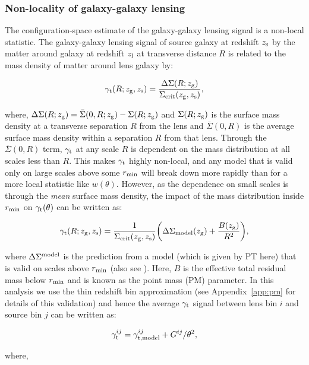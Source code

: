 \documentclass[aps, prd,twocolumn,superscriptaddress,nofootinbib,preprintnumbers]{revtex4-1}
\newcommand{\gammat}{\ensuremath{\gamma_{\rm t}(\theta)}}
\newcommand{\wtheta}{\ensuremath{w(\theta)}}
\newcommand{\SP}[1]{{\color{orange}[SP: #1]}}
\newcommand{\gary}[1]{\textcolor{red}{#1}}
\begin{document}
\subsubsection{Non-locality of galaxy-galaxy lensing}  \label{sec:pm_theory}
The configuration-space estimate of the galaxy-galaxy lensing signal is a
non-local statistic. The galaxy-galaxy lensing
signal of source galaxy at redshift $z_{\rm s}$ by the matter around
galaxy at redshift $z_{\rm l}$ at transverse
distance $R$ is related to the mass density of matter around lens
galaxy by:
\begin{linenomath*}
\begin{equation}
    \gamma_{\rm t}(R;z_{\rm g},z_{\rm s}) = \frac{\Delta \Sigma (R;z_{\rm g})}{\Sigma_{\rm crit} (z_{\rm g},z_{\rm s})},
\end{equation}
\end{linenomath*}
where, $\Delta \Sigma(R;z_{\rm g}) = \bar{\Sigma}(0,R; z_{\rm g}) - \Sigma(R;z_{\rm g})$ and $\Sigma(R;z_{\rm g})$ is the surface mass density at a transverse separation $R$ from the lens and $\bar{\Sigma}(0,R)$ is the average surface mass density within a separation $R$ from that lens. Through the $\bar{\Sigma}(0,R)$ term, $\gamma_{\rm t}$  at any scale $R$ is dependent on the mass distribution at all scales less than $R$. This makes $\gamma_{\rm t}$  highly non-local, and any model that is valid only on large scales above some $r_{\rm min}$ will break down more rapidly than for a more local statistic like \wtheta. However, as the dependence on small scales is through the \textit{mean} surface mass density, the impact of the mass distribution inside $r_{\rm min}$ on $\gammat$ can be written as:
\begin{linenomath*}
\begin{equation}
    \gamma_{\rm t}(R;z_{\rm g},z_{\rm s}) = \frac{1}{\Sigma_{\rm crit}(z_{\rm g},z_{\rm s})} \bigg(\Delta \Sigma_{\rm model}(z_{\rm g}) + \frac{B(z_{\rm g})}{R^2} \bigg),
\end{equation}
\end{linenomath*}
where $\Delta \Sigma^{\rm model}$ is the prediction from a model (which is given by PT here) that is valid on scales above $r_{\rm min}$ (also see \citep{Baldauf_2010}). Here, $B$ is the effective total residual mass below $r_{\rm min}$ and is known as the point mass (PM) parameter. In this analysis we use the thin redshift bin approximation 
(see Appendix~\ref{app:pm} for details of this validation) and hence the average $\gamma_{\rm t}$ signal between lens bin $i$ and source bin $j$ can be written as:
\begin{linenomath*}
\begin{equation}
    \gamma^{ij}_{{\rm t}} = \gamma^{ij}_{{\rm t, model}} + G^{ij}/\theta^2,
\end{equation}
\end{linenomath*}
where,
\end{document}
